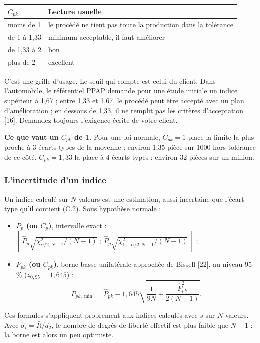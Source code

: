 \documentclass[11pt,a4paper]{article}
\newcommand{\Rb}{\bar{R}}
\begin{document}
\begin{center}\small
\begin{tabular}{@{}ll@{}}\toprule
$C_{pk}$ & \textbf{Lecture usuelle}\\\midrule
moins de 1 & le procédé ne tient pas toute la production dans la tolérance\\
de 1 à 1,33 & minimum acceptable, il faut améliorer\\
de 1,33 à 2 & bon\\
plus de 2 & excellent\\\bottomrule
\end{tabular}
\end{center}

\begin{note}
C'est une grille d'usage. Le seuil qui compte est celui du client. Dans l'automobile, le référentiel PPAP demande pour une étude initiale un indice supérieur à 1,67 ; entre 1,33 et 1,67, le procédé peut être accepté avec un plan d'amélioration ; en dessous de 1,33, il ne remplit pas les critères d'acceptation [16]. Demandez toujours l'exigence écrite de votre client.
\end{note}

\textbf{Ce que vaut un $C_{pk}$ de 1.} Pour une loi normale, $C_{pk}=1$ place la limite la plus proche à 3 écarts-types de la moyenne : environ 1,35 pièce sur \num{1000} hors tolérance de ce côté. $C_{pk}=1{,}33$ la place à 4 écarts-types : environ 32 pièces sur un million.

\subsubsection{L'incertitude d'un indice}\label{sec:capic}
Un indice calculé sur $N$ valeurs est une estimation, aussi incertaine que l'écart-type qu'il contient (C.2). Sous hypothèse normale :
\begin{itemize}[nosep]
\item \textbf{$P_p$ (ou $C_p$)}, intervalle exact : $\left[\,\hat P_p\sqrt{\chi^2_{\alpha/2;N-1}/(N-1)}\ ;\ \hat P_p\sqrt{\chi^2_{1-\alpha/2;N-1}/(N-1)}\,\right]$ ;
\item \textbf{$P_{pk}$ (ou $C_{pk}$)}, borne basse unilatérale approchée de Bissell [22], au niveau 95 \% ($z_{0{,}95}=1{,}645$) :
\[
P_{pk,\min}=\hat P_{pk}-1{,}645\sqrt{\frac1{9N}+\frac{\hat P_{pk}^2}{2(N-1)}} .
\]
\end{itemize}
Ces formules s'appliquent proprement aux indices calculés avec $s$ sur $N$ valeurs. Avec $\hat\sigma_i=\Rb/d_2$, le nombre de degrés de liberté effectif est plus faible que $N-1$ : la borne est alors un peu optimiste.
\end{document}
